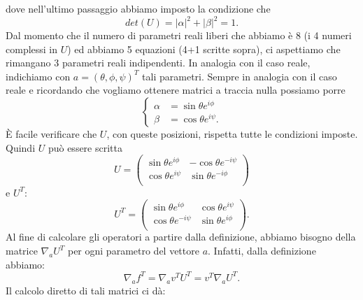 \documentclass[fleqn,italian]{article}
\theoremstyle{definition}
\theoremstyle{remark}
\theoremstyle{plain}%
\theoremstyle{definition}
\theoremstyle{remark}
\numberwithin{equation}{section}
\numberwithin{thm}{section}
\begin{document}
dove nell'ultimo passaggio abbiamo imposto la condizione che 
\begin{equation}
det(U)=|\alpha|^2+|\beta|^2=1.
\end{equation}
Dal momento che il numero di parametri reali liberi che abbiamo \`e 8
(i 4 numeri complessi in $U$) ed abbiamo 5 equazioni (4+1 scritte sopra), ci
aspettiamo che rimangano 3 parametri reali indipendenti. In analogia
con il caso reale, indichiamo con $a=(\theta,\phi,\psi)^T$ tali parametri. 
Sempre in analogia con il caso reale e ricordando che vogliamo ottenere
matrici a traccia nulla possiamo porre
\begin{equation}
\begin{cases}
\alpha & = \sin\theta e^{i\phi} \\
\beta  & = \cos\theta e^{i\psi} .
\end{cases}
\end{equation}
\`E facile verificare che $U$, con queste posizioni, rispetta tutte le 
condizioni imposte. Quindi $U$ pu\`o essere scritta
\begin{equation}
U=\begin{pmatrix} \sin\theta e^{i\phi} & -\cos\theta e^{-i\psi} \\
                  \cos\theta e^{i\psi} & \sin\theta e^{-i\phi} \\
  \end{pmatrix}
\end{equation}
e $U^T$:
\begin{equation}
U^T=\begin{pmatrix} \sin\theta e^{i\phi} & \cos\theta e^{i\psi} \\
                  \cos\theta e^{-i\psi} & \sin\theta e^{i\phi} \\
  \end{pmatrix}.
\end{equation}
Al fine di calcolare gli operatori a partire dalla definizione, abbiamo 
bisogno della matrice $\nabla_a U^T$ per ogni parametro del vettore
 $a$. Infatti, dalla definizione abbiamo:
\begin{equation}
\nabla_a f^T=\nabla_a v^T U^T=v^T\nabla_a U^T.
\end{equation}
Il calcolo diretto di tali matrici ci d\`a:
\end{document}
